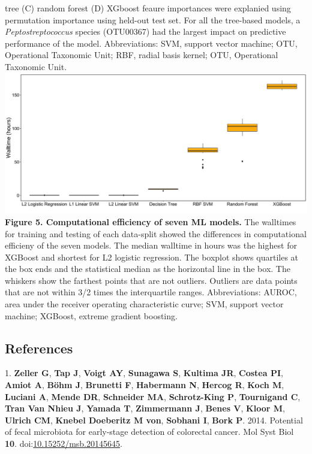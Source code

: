 \documentclass[11pt,]{article}
\begin{document}
tree (C) random forest (D) XGboost feaure importances were explanied
using permutation importance using held-out test set. For all the
tree-based models, a \emph{Peptostreptococcus} species (OTU00367) had
the largest impact on predictive performance of the model.
Abbreviations: SVM, support vector machine; OTU, Operational Taxonomic
Unit; RBF, radial basis kernel; OTU, Operational Taxonomic Unit.
\newpage
\includegraphics{Figure_5.png} \textbf{Figure 5. Computational
efficiency of seven ML models.} The walltimes for training and testing
of each data-split showed the differences in computational efficieny of
the seven models. The median walltime in hours was the highest for
XGBoost and shortest for L2 logistic regression. The boxplot shows
quartiles at the box ends and the statistical median as the horizontal
line in the box. The whiskers show the farthest points that are not
outliers. Outliers are data points that are not within 3/2 times the
interquartile ranges. Abbreviations: AUROC, area under the receiver
operating characteristic curve; SVM, support vector machine; XGBoost,
extreme gradient boosting.\\
\newpage

\subsection{References}\label{references}

\hypertarget{refs}{}
\hypertarget{ref-zeller_potential_2014}{}
1. \textbf{Zeller G}, \textbf{Tap J}, \textbf{Voigt AY},
\textbf{Sunagawa S}, \textbf{Kultima JR}, \textbf{Costea PI},
\textbf{Amiot A}, \textbf{Böhm J}, \textbf{Brunetti F},
\textbf{Habermann N}, \textbf{Hercog R}, \textbf{Koch M},
\textbf{Luciani A}, \textbf{Mende DR}, \textbf{Schneider MA},
\textbf{Schrotz-King P}, \textbf{Tournigand C}, \textbf{Tran Van Nhieu
J}, \textbf{Yamada T}, \textbf{Zimmermann J}, \textbf{Benes V},
\textbf{Kloor M}, \textbf{Ulrich CM}, \textbf{Knebel Doeberitz M von},
\textbf{Sobhani I}, \textbf{Bork P}. 2014. Potential of fecal microbiota
for early-stage detection of colorectal cancer. Mol Syst Biol
\textbf{10}.
doi:\href{https://doi.org/10.15252/msb.20145645}{10.15252/msb.20145645}.
\end{document}
